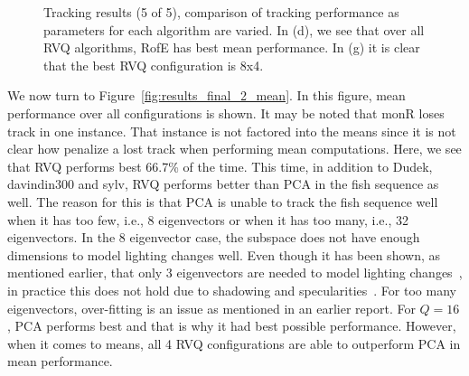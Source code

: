 \begin{figure}[h!]
								\caption{Tracking results (5 of 5), comparison of tracking performance as parameters for each algorithm are varied.  In (d), we see that over all RVQ algorithms, RofE has best mean performance.  In (g) it is clear that the best RVQ configuration is 8x4.}
								\label{fig:results_final_5_configs}
								\end{figure}


We now turn to Figure~\ref{fig:results_final_2_mean}.  In this figure, mean performance over all configurations is shown.  It may be noted that monR loses track in one instance.  That instance is not factored into the means since it is not clear how penalize a lost track when performing mean computations.  Here, we see that RVQ performs best 66.7\% of the time.  This time, in addition to Dudek, davindin300 and sylv, RVQ performs better than PCA in the fish sequence as well.  The reason for this is that PCA is unable to track the fish sequence well when it has too few, i.e., 8 eigenvectors or when it has too many, i.e., 32 eigenvectors.  In the 8 eigenvector case, the subspace does not have enough dimensions to model lighting changes well.  Even though it has been shown, as mentioned earlier, that only 3 eigenvectors are needed to model lighting changes~\cite{1987_JNL_Faces_Sirovich}, in practice this does not hold due to shadowing and specularities~\cite{1997_JNL_EigenVsFisherFaces_Bel}.  For too many eigenvectors, over-fitting is an issue as mentioned in an earlier report.  For $Q=16$, PCA performs best and that is why it had best possible performance.  However, when it comes to means, all 4 RVQ configurations are able to outperform PCA in mean performance.

